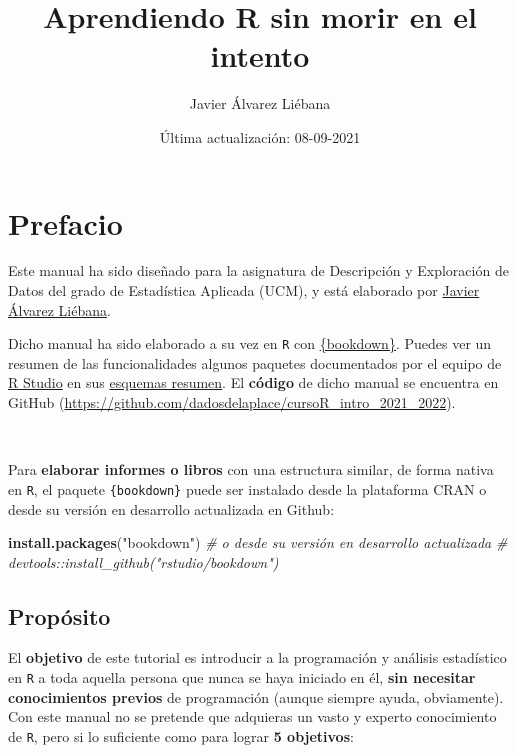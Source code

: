 \documentclass[11pt,]{book}
\title{Aprendiendo R sin morir en el intento}
\author{Javier Álvarez Liébana}
\date{Última actualización: 08-09-2021}
\newenvironment{Shaded}{\begin{snugshade}}{\end{snugshade}}
\newcommand{\CommentTok}[1]{\textcolor[rgb]{0.37,0.37,0.37}{\textit{#1}}}
\newcommand{\KeywordTok}[1]{\textcolor[rgb]{0.27,0.27,0.27}{\textbf{#1}}}
\newcommand{\NormalTok}[1]{#1}
\newcommand{\StringTok}[1]{\textcolor[rgb]{0.5,0.5,0.5}{#1}}
\begin{document}
\maketitle

{
\hypersetup{linkcolor=}
\setcounter{tocdepth}{2}
\tableofcontents
}
\listoftables
\listoffigures
\hypertarget{prefacio}{%
\chapter*{Prefacio}\label{prefacio}}


Este manual ha sido diseñado para la asignatura de Descripción y Exploración de Datos del grado de Estadística Aplicada (UCM), y está elaborado por \href{twitter.com/dadosdelaplace}{Javier Álvarez Liébana}.

Dicho manual ha sido elaborado a su vez en \texttt{R} con \href{https://github.com/rstudio/bookdown}{\{bookdown\}}. Puedes ver un resumen de las funcionalidades algunos paquetes documentados por el equipo de \href{https://www.rstudio.com/}{R Studio} en sus \href{https://www.rstudio.com/resources/cheatsheets/}{esquemas resumen}. El \textbf{código} de dicho manual se encuentra en GitHub (\url{https://github.com/dadosdelaplace/cursoR_intro_2021_2022}).

~

Para \textbf{elaborar informes o libros} con una estructura similar, de forma nativa en \texttt{R}, el paquete \texttt{\{bookdown\}} puede ser instalado desde la plataforma CRAN o desde su versión en desarrollo actualizada en Github:

\begin{Shaded}
\begin{Highlighting}[]
\KeywordTok{install.packages}\NormalTok{(}\StringTok{"bookdown"}\NormalTok{)}
\CommentTok{# o desde su versión en desarrollo actualizada}
\CommentTok{# devtools::install_github("rstudio/bookdown")}
\end{Highlighting}
\end{Shaded}

\hypertarget{propuxf3sito}{%
\section*{Propósito}\label{propuxf3sito}}


El \textbf{objetivo} de este tutorial es introducir a la programación y análisis estadístico en \texttt{R} a toda aquella persona que nunca se haya iniciado en él, \textbf{sin necesitar conocimientos previos} de programación (aunque siempre ayuda, obviamente). Con este manual no se pretende que adquieras un vasto y experto conocimiento de \texttt{R}, pero si lo suficiente como para lograr \textbf{5 objetivos}:
\end{document}
